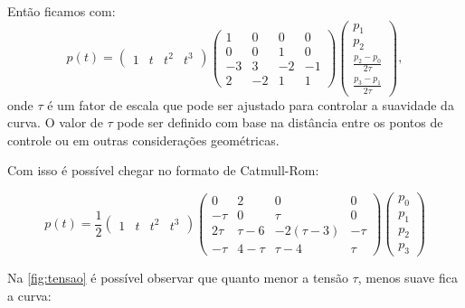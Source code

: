 Então ficamos com:
\begin{equation}
    p(t) =  
        \left(
        \begin{array}{rrrr}
            1 & t & t^2 & t^3
        \end{array}
        \right)
        \left(
        \begin{array}{rrrr}
            1 & 0 & 0 & 0 \\
            0 & 0 & 1 & 0 \\
            -3 & 3 & -2 & -1 \\
                2 & -2 & 1 & 1
        \end{array}
        \right)
    \left(
        \begin{array}{r}
            p_1 \\
            p_2 \\
            \frac{p_2 - p_0}{2\tau} \\
                \frac{p_3 - p_1}{2\tau}
        \end{array}
        \right),
\end{equation}
onde $\tau$ é um fator de escala que pode ser ajustado para controlar a suavidade da curva. O valor de $\tau$ pode ser definido com base na distância entre os pontos de controle ou em outras considerações geométricas.

Com isso é possível chegar no formato de Catmull-Rom:

\begin{equation}
    p(t) = \frac{1}{2}
       \left(
 	\begin{array}{rrrr}
 		1 & t & t^2 & t^3
 	\end{array}
    \right)
    \left(
 	\begin{array}{rrrr}
 		0 & 2 & 0 & 0 \\
 	    -\tau & 0 & \tau & 0 \\
 		2\tau & \tau-6 & -2(\tau-3) & -\tau \\
            -\tau & 4-\tau & \tau-4 & \tau
 	\end{array}
    \right)
   \left(
 	\begin{array}{r}
 		p_0 \\
 	    p_1 \\
 		p_2 \\
            p_3
 	\end{array}
    \right)
\end{equation}

Na \autoref{fig:tensao} é possível observar que quanto menor a tensão $\tau$, menos suave fica a curva:

